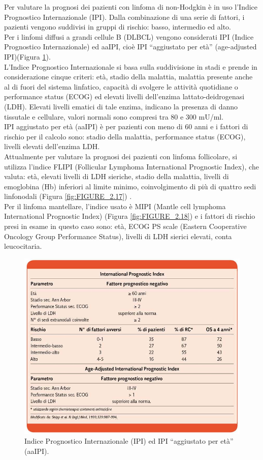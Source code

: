 Per valutare la prognosi dei pazienti con linfoma di non-Hodgkin è in uso l’Indice Prognostico Internazionale (IPI). 
Dalla combinazione di una serie di fattori, i pazienti vengono suddivisi in gruppi di rischio: basso, intermedio 
ed alto\cite{AIOM}.\\ 
Per i linfomi diffusi a grandi cellule B (DLBCL) vengono considerati IPI (Indice Prognostico Internazionale) ed aaIPI, 
cioè IPI “aggiustato per età” (age-adjusted IPI)(Figura \ref{fig:FIGURE_2.16}).\\
L’Indice Prognostico Internazionale si basa sulla suddivisione in stadi e prende in considerazione cinque criteri: 
età, stadio della malattia, malattia presente anche al di fuori del sistema linfatico, 
capacità di svolgere le attività quotidiane o performance status (ECOG)
ed elevati livelli dell’enzima lattato-deidrogenasi (LDH). Elevati livelli ematici di tale enzima,
indicano la presenza di danno tissutale e cellulare, valori normali sono compresi tra 80 e 300 mU/ml\cite{AIOM}.\\ 
IPI aggiustato per età (aaIPI) è per pazienti con meno di 60 anni e i fattori di rischio per il calcolo sono: 
stadio della malattia, performance status (ECOG), livelli elevati dell’enzima LDH.\\
Attualmente per valutare la prognosi dei pazienti con linfoma follicolare, si utilizza l’indice FLIPI 
(Follicular Lymphoma International Prognostic Index), che valuta: 
età, elevati livelli di LDH sieriche, stadio della malattia, livelli di emoglobina (Hb) inferiori al limite minimo, 
coinvolgimento di più di quattro sedi linfonodali (Figura \ref{fig:FIGURE_2.17}) \cite{AIOM}.\\
Per il linfoma mantellare, l’indice usato è MIPI (Mantle cell lymphoma International Prognostic Index) 
(Figura \ref{fig:FIGURE_2.18}) e i fattori di rischio presi in esame in questo caso sono: età, ECOG PS scale 
(Eastern Cooperative Oncology Group Performance Status), livelli di LDH sierici elevati, conta leucocitaria\cite{MIPI}.

\begin{figure}[H]
    \begin{center}
    \includegraphics[width=0.5\columnwidth]{img/IPI-AAIPI.jpeg}
    \vspace{-3mm}
    \end{center}
    \caption{Indice Prognostico Internazionale (IPI) ed IPI “aggiustato per età” (aaIPI).
    \cite{img15-18}}
    \label{fig:FIGURE_2.16}
\end{figure}

